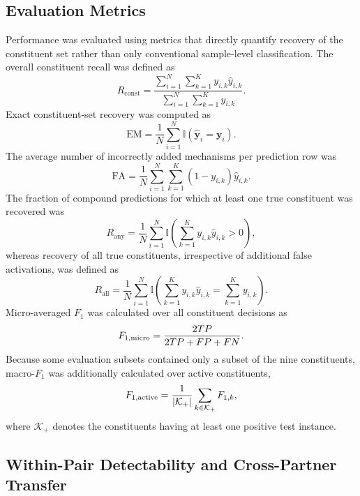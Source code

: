 \subsection{Evaluation Metrics}
\label{sec:metrics}

Performance was evaluated using metrics that directly quantify recovery of
the constituent set rather than only conventional sample-level
classification. The overall constituent recall was defined as
\begin{equation}
R_{\mathrm{const}} =
\frac{\sum_{i=1}^{N}\sum_{k=1}^{K} y_{i,k}\hat{y}_{i,k}}
     {\sum_{i=1}^{N}\sum_{k=1}^{K} y_{i,k}}.
\end{equation}
Exact constituent-set recovery was computed as
\begin{equation}
\mathrm{EM} = \frac{1}{N}\sum_{i=1}^{N}
\mathbb{I}\left(\hat{\mathbf{y}}_i = \mathbf{y}_i\right).
\end{equation}
The average number of incorrectly added mechanisms per prediction row was
\begin{equation}
\mathrm{FA} = \frac{1}{N}\sum_{i=1}^{N}\sum_{k=1}^{K}
\left(1 - y_{i,k}\right)\hat{y}_{i,k}.
\end{equation}
The fraction of compound predictions for which at least one true
constituent was recovered was
\begin{equation}
R_{\mathrm{any}} = \frac{1}{N}\sum_{i=1}^{N}
\mathbb{I}\left(\sum_{k=1}^{K} y_{i,k}\hat{y}_{i,k} > 0\right),
\end{equation}
whereas recovery of all true constituents, irrespective of additional false
activations, was defined as
\begin{equation}
R_{\mathrm{all}} = \frac{1}{N}\sum_{i=1}^{N}
\mathbb{I}\left(\sum_{k=1}^{K} y_{i,k}\hat{y}_{i,k}
= \sum_{k=1}^{K} y_{i,k}\right).
\end{equation}
Micro-averaged $F_1$ was calculated over all constituent decisions as
\begin{equation}
F_{1,\mathrm{micro}} = \frac{2TP}{2TP + FP + FN}.
\end{equation}
Because some evaluation subsets contained only a subset of the nine
constituents, macro-$F_1$ was additionally calculated over active
constituents,
\begin{equation}
F_{1,\mathrm{active}} = \frac{1}{|\mathcal{K}_{+}|}
\sum_{k \in \mathcal{K}_{+}} F_{1,k},
\end{equation}
where $\mathcal{K}_{+}$ denotes the constituents having at least one
positive test instance.

\subsection{Within-Pair Detectability and Cross-Partner Transfer}
\label{sec:transfer}

